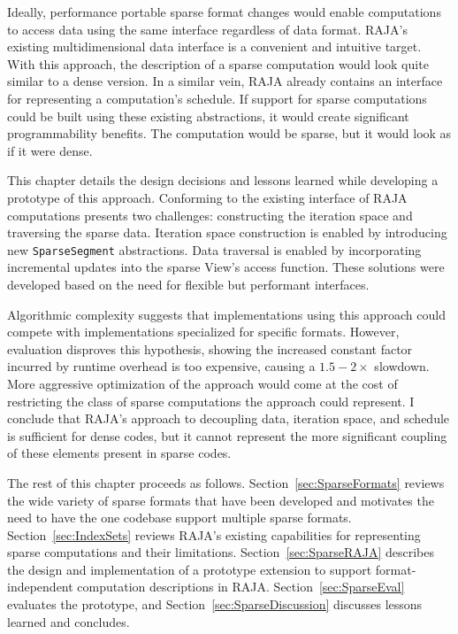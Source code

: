 Ideally, performance portable sparse format changes would enable computations to access data using the same interface regardless of data format.
RAJA's existing multidimensional data interface is a convenient and intuitive target.
With this approach, the description of a sparse computation would look quite similar to a dense version.
In a similar vein, RAJA already contains an interface for representing a computation's schedule.
If support for sparse computations could be built using these existing abstractions, it would create significant programmability benefits.
The computation would be sparse, but it would look as if it were dense.
 
This chapter details the design decisions and lessons learned while developing a prototype of this approach.
Conforming to the existing interface of RAJA computations presents two challenges: constructing the iteration space and traversing the sparse data.
Iteration space construction is enabled by introducing new \verb.SparseSegment. abstractions.
Data traversal is enabled by incorporating incremental updates into the sparse View's access function.
These solutions were developed based on the need for flexible but performant interfaces.

Algorithmic complexity suggests that implementations using this approach could compete with implementations specialized for specific formats.
However, evaluation disproves this hypothesis, showing the increased constant factor incurred by runtime overhead is too expensive, causing a $1.5-2\times$ slowdown.
More aggressive optimization of the approach would come at the cost of restricting the class of sparse computations the approach could represent.
I conclude that RAJA's approach to decoupling data, iteration space, and schedule is sufficient for dense codes, but it cannot represent the more significant coupling of these elements present in sparse codes.

The rest of this chapter proceeds as follows.
Section~\ref{sec:SparseFormats} reviews the wide variety of sparse formats that have been developed and motivates the need to have the one codebase support multiple sparse formats.
Section~\ref{sec:IndexSets} reviews RAJA's existing capabilities for representing sparse computations and their limitations.
Section~\ref{sec:SparseRAJA} describes the design and implementation of a prototype extension to support format-independent computation descriptions in RAJA.
Section~\ref{sec:SparseEval} evaluates the prototype, and Section~\ref{sec:SparseDiscussion} discusses lessons learned and concludes.



